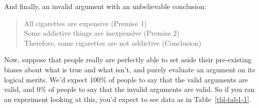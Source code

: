 \documentclass[
  a4paper,
]{book}
\begin{document}
And finally, an invalid argument with an unbelievable conclusion:

\begin{quote}
All cigarettes are expensive (Premise 1)\\
Some addictive things are inexpensive (Premise 2)\\
Therefore, some cigarettes are not addictive (Conclusion)
\end{quote}

Now, suppose that people really are perfectly able to set aside their
pre-existing biases about what is true and what isn't, and purely
evaluate an argument on its logical merits. We'd expect 100\% of people
to say that the valid arguments are valid, and 0\% of people to say that
the invalid arguments are valid. So if you ran an experiment looking at
this, you'd expect to see data as in Table~\ref{tbl-tab1-1}.

\hypertarget{tbl-tab1-1}{}
 
  \providecommand{\huxb}[2]{\arrayrulecolor[RGB]{#1}\global\arrayrulewidth=#2pt}
  \providecommand{\huxvb}[2]{\color[RGB]{#1}\vrule width #2pt}
  \providecommand{\huxtpad}[1]{\rule{0pt}{#1}}
  \providecommand{\huxbpad}[1]{\rule[-#1]{0pt}{#1}}
\end{document}
